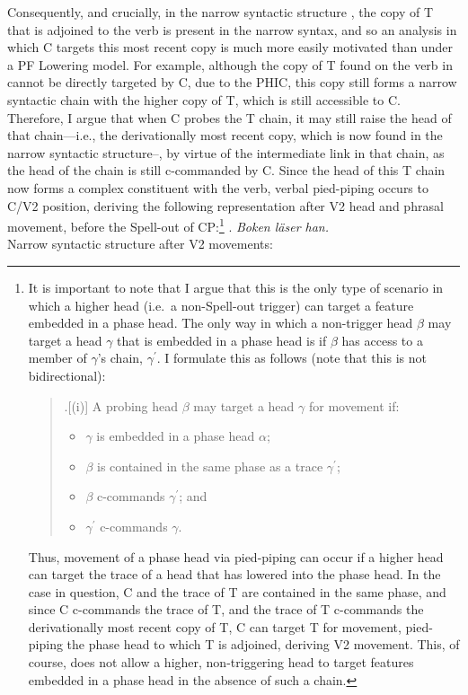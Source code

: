 Consequently, and crucially, in the narrow syntactic structure \Last[c], the copy of T that is adjoined to the verb is present in the narrow syntax, and so an analysis in which C\raisebox{-4pt}{\small{[-T]}} targets this most recent copy is much more easily motivated than under a PF Lowering model. For example, although the copy of T found on the verb in \Last[c] cannot be directly targeted by C, due to the PHIC, this copy still forms a narrow syntactic chain with the higher copy of T, which is still accessible to C. Therefore, I argue that when C probes the T chain, it may still raise the head of that chain---i.e., the derivationally most recent copy, which is now found in the narrow syntactic structure--, by virtue of the intermediate link in that chain, as the head of the chain is still c-commanded by C. Since the head of this T chain now forms a complex constituent with the verb, verbal pied-piping occurs to C/V2 position, deriving the following representation after V2 head and phrasal movement, before the Spell-out of CP:\footnote{\label{phase_chain_fn}It is important to note that I argue that this is the only type of scenario in which a higher head (i.e.\ a non-Spell-out trigger) can target a feature embedded in a phase head. The only way in which a non-trigger head $\beta$ may target a head $\gamma$ that is embedded in a phase head is if $\beta$ has access to a member of $\gamma$'s chain, $\gamma^{\prime}$. I formulate this as follows (note that this is not bidirectional):
\begin{quote}
\ex.[(i)] A probing head $\beta$ may target a head $\gamma$ for movement if:
\begin{itemize}
\item $\gamma$ is embedded in a phase head $\alpha$;
\item $\beta$ is contained in the same phase as a trace $\gamma^{\prime}$;
\item $\beta$ c-commands $\gamma^{\prime}$; and
\item $\gamma^{\prime}$ c-commands $\gamma$.
\end{itemize}

\end{quote}
Thus, movement of a phase head via pied-piping can occur if a higher head can target the trace of a head that has lowered into the phase head. In the case in question, C and the trace of T are contained in the same phase, and since C c-commands the trace of T, and the trace of T c-commands the derivationally most recent copy of T, C can target T for movement, pied-piping the phase head to which T is adjoined, deriving V2 movement. This, of course, does not allow a higher, non-triggering head to target features embedded in a phase head in the absence of such a chain.}
\clearpage
\noindent
\ex. {\it Boken l\"{a}ser han.}\\
Narrow syntactic structure after V2 movements:\\

